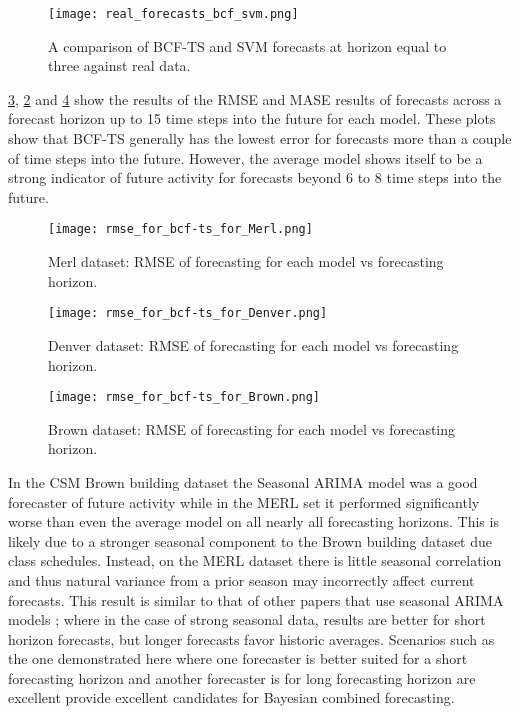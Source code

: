 \begin{figure}[h]
\centering
\texttt{[image: real\_forecasts\_bcf\_svm.png]}
\caption{A comparison of BCF-TS and SVM forecasts at horizon equal to three against real data.}
\label{fig:realbcfsvm}
\end{figure}

\ref{fig:rmseplotdenver}, \ref{fig:rmseplotmerl} and \ref{fig:rmseplotbrown} show the results of the RMSE and MASE results of forecasts across a forecast horizon up to 15 time steps into the future for each model.  These plots show that BCF-TS generally has the lowest error for forecasts more than a couple of time steps into the future.  However, the average model shows itself to be a strong indicator of future activity for forecasts beyond 6 to 8 time steps into the future.

\begin{figure}[!ht]
	\begin{center}
		\texttt{[image: rmse\_for\_bcf-ts\_for\_Merl.png]}
	\end{center}
	\caption{Merl dataset: RMSE of forecasting for each model vs forecasting horizon.}
	\label{fig:rmseplotmerl}
\end{figure}

\begin{figure}[h]
	\begin{center}
		\texttt{[image: rmse\_for\_bcf-ts\_for\_Denver.png]}
	\end{center}
	\caption{Denver dataset: RMSE of forecasting for each model vs forecasting horizon.}
	\label{fig:rmseplotdenver}
\end{figure}

\begin{figure}[h]
	\begin{center}
		\texttt{[image: rmse\_for\_bcf-ts\_for\_Brown.png]}
	\end{center}
	\caption{Brown dataset: RMSE of forecasting for each model vs forecasting horizon.}
	\label{fig:rmseplotbrown}
\end{figure}

In the CSM Brown building dataset the Seasonal ARIMA model was a good forecaster of future activity while in the MERL set it performed significantly worse than even the average model on all nearly all forecasting horizons.  This is likely due to a stronger seasonal component to the Brown building dataset due class schedules.  Instead, on the MERL dataset there is little seasonal correlation and thus natural variance from a prior season may incorrectly affect current forecasts.  This result is similar to that of other papers that use seasonal ARIMA models \cite{Newsham2010}; where in the case of strong seasonal data, results are better for short horizon forecasts, but longer forecasts favor historic averages.  Scenarios such as the one demonstrated here where one forecaster is better suited for a short forecasting horizon and another forecaster is for long forecasting horizon are excellent provide excellent candidates for Bayesian combined forecasting.

